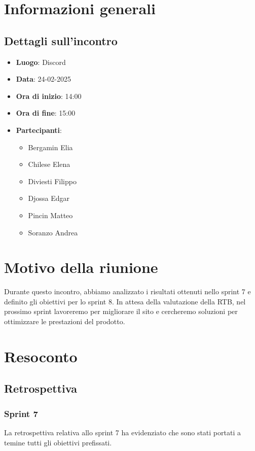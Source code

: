 \section{Informazioni generali}
\subsection{Dettagli sull'incontro}
\begin{itemize}
    \item \textbf{Luogo}: Discord
    \item \textbf{Data}: 24-02-2025
    \item \textbf{Ora di inizio}: 14:00
    \item \textbf{Ora di fine}: 15:00
    \item \textbf{Partecipanti}:
    \begin{itemize}
        \item Bergamin Elia
        \item Chilese Elena
        \item Diviesti Filippo
        \item Djossa Edgar
        \item Pincin Matteo 
        \item Soranzo Andrea  
    \end{itemize}
\end{itemize}

\section{Motivo della riunione}
Durante questo incontro, abbiamo analizzato i risultati ottenuti nello sprint 7 e definito gli obiettivi per lo sprint 8.
In attesa della valutazione della RTB, nel prossimo sprint lavoreremo per migliorare il sito e cercheremo soluzioni per ottimizzare le prestazioni del prodotto.
\section{Resoconto}
\subsection{Retrospettiva}
\subsubsection{Sprint 7}
La retrospettiva relativa allo sprint 7 ha evidenziato che sono stati portati a temine tutti gli obiettivi prefissati.

